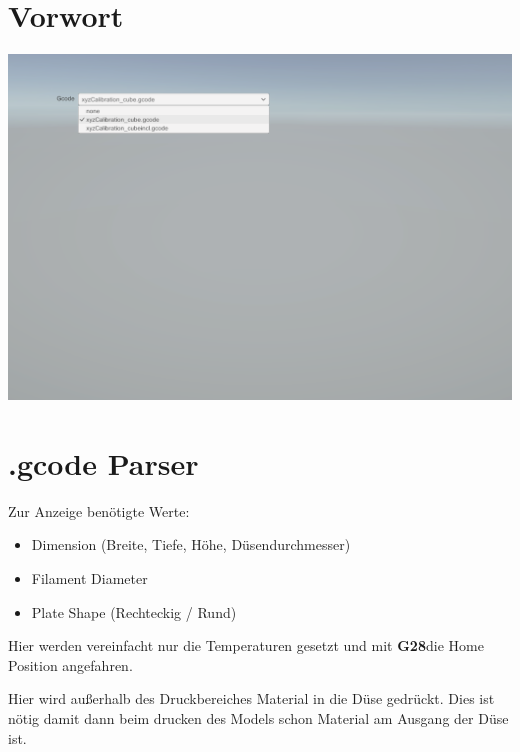 \section{Vorwort}

\includegraphics[width=\paperwidth-3cm]{./pictures/dropdown.png}


\section{.gcode Parser}



Zur Anzeige benötigte Werte:
\begin{itemize}
  \item Dimension (Breite, Tiefe, Höhe, Düsendurchmesser)
  \item Filament Diameter
  \item Plate Shape (Rechteckig / Rund)
\end{itemize}


Hier werden vereinfacht nur die Temperaturen gesetzt und mit \textbf{G28}die Home Position angefahren.

\newpage


Hier wird außerhalb des Druckbereiches Material in die Düse gedrückt.
Dies ist nötig damit dann beim drucken des Models schon Material am Ausgang der Düse ist.

